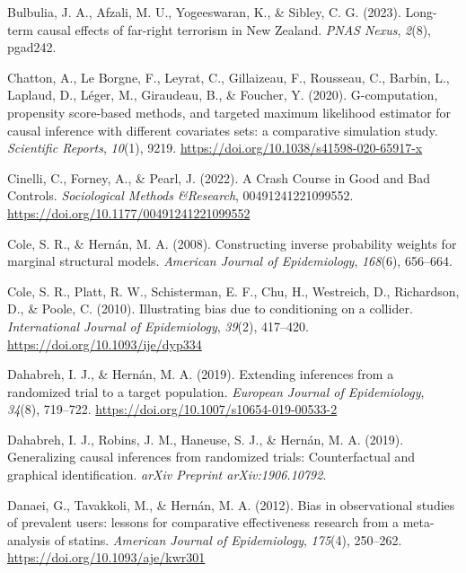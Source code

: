 \documentclass[
  single column]{article}
\newlength{\cslhangindent}
\newenvironment{CSLReferences}[2] %
 {\begin{list}{}{%
  \setlength{\itemindent}{0pt}
  \setlength{\leftmargin}{0pt}
  \setlength{\parsep}{0pt}
  \ifodd #1
   \setlength{\leftmargin}{\cslhangindent}
   \setlength{\itemindent}{-1\cslhangindent}
  \fi
  \setlength{\itemsep}{#2\baselineskip}}}
 {\end{list}}
\begin{document}
\begin{CSLReferences}{1}{0}
Bulbulia, J. A., Afzali, M. U., Yogeeswaran, K., \& Sibley, C. G.
(2023). Long-term causal effects of far-right terrorism in {N}ew
{Z}ealand. \emph{PNAS Nexus}, \emph{2}(8), pgad242.

Chatton, A., Le Borgne, F., Leyrat, C., Gillaizeau, F., Rousseau, C.,
Barbin, L., Laplaud, D., Léger, M., Giraudeau, B., \& Foucher, Y.
(2020). G-computation, propensity score-based methods, and targeted
maximum likelihood estimator for causal inference with different
covariates sets: a comparative simulation study. \emph{Scientific
Reports}, \emph{10}(1), 9219.
\url{https://doi.org/10.1038/s41598-020-65917-x}

Cinelli, C., Forney, A., \& Pearl, J. (2022). A Crash Course in Good and
Bad Controls. \emph{Sociological Methods \&Research}, 00491241221099552.
\url{https://doi.org/10.1177/00491241221099552}

Cole, S. R., \& Hernán, M. A. (2008). Constructing inverse probability
weights for marginal structural models. \emph{American Journal of
Epidemiology}, \emph{168}(6), 656--664.

Cole, S. R., Platt, R. W., Schisterman, E. F., Chu, H., Westreich, D.,
Richardson, D., \& Poole, C. (2010). Illustrating bias due to
conditioning on a collider. \emph{International Journal of
Epidemiology}, \emph{39}(2), 417--420.
\url{https://doi.org/10.1093/ije/dyp334}

Dahabreh, I. J., \& Hernán, M. A. (2019). Extending inferences from a
randomized trial to a target population. \emph{European Journal of
Epidemiology}, \emph{34}(8), 719--722.
\url{https://doi.org/10.1007/s10654-019-00533-2}

Dahabreh, I. J., Robins, J. M., Haneuse, S. J., \& Hernán, M. A. (2019).
Generalizing causal inferences from randomized trials: Counterfactual
and graphical identification. \emph{arXiv Preprint arXiv:1906.10792}.

Danaei, G., Tavakkoli, M., \& Hernán, M. A. (2012). Bias in
observational studies of prevalent users: lessons for comparative
effectiveness research from a meta-analysis of statins. \emph{American
Journal of Epidemiology}, \emph{175}(4), 250--262.
\url{https://doi.org/10.1093/aje/kwr301}


\end{CSLReferences}
\end{document}
